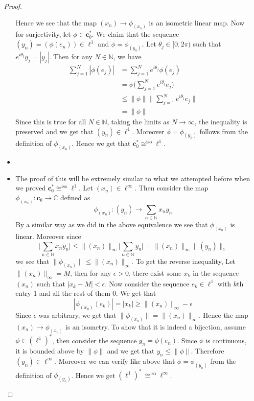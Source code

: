 \begin{proof}
\begin{itemize}[]
      Hence we see that the map $(x_n) \to \phi_{(x_n)}$ is an isometric linear map. Now for surjectivity, let $\phi \in \textbf{c}_0^{*}$. We claim that the sequence $(y_n) = (\phi(e_n)) \in \ell^1$ and $\phi = \phi_{(y_n)}$. Let $\theta_j \in [0, 2\pi)$ such that $e^{ i \theta_j}y_j = |y_j|$. Then for any $N \in \mathbb{N}$, we have \begin{align*}
        \sum_{j = 1}^{N} |\phi(e_j)| &=  \sum_{j = 1}^{N} e^{i \theta_j}\phi(e_j) \\ 
        &= \phi \Big(\sum_{j = 1}^{N} e^{i \theta_j} e_j \Big) \\ 
        &\le \|\phi\| \Big \| \sum_{j = 1}^{N} e^{i \theta_j} e_j \Big \| \\ 
        &= \|\phi\|
        \end{align*}
       Since this is true for all $N \in \mathbb{N}$, taking the limits as $N \to \infty$, the inequality is preserved and we get that $(y_n) \in \ell^1$. Moreover $\phi = \phi_{(y_n)}$ follows from the definition of $ \phi_{(x_n)}$. Hence we get that $  \textbf{c}_0^{*} \cong^{\textrm{iso}} \ell^1$.
    \item 
    \item The proof of this will be extremely similar to what we attempted before when we proved $\textbf{c}_0^{*} \cong^{\textrm{iso}} \ell^1$. Let $(x_n) \in \ell^\infty$. Then consider the map $\phi_{(x_n)}: \textbf{c}_0 \to \mathbb{C}$ defined as $$\phi_{(x_n)}: (y_n) \to \sum_{n \in \mathbb{N}} x_ny_n$$
      By a similar way as we did in the above equivalence we see that $\phi_{(x_n)}$ is linear. Moreover since \[
        \Big | \sum_{n \in \mathbb{N}} x_n y_n \Big | \le \|(x_n)\|_\infty \Big | \sum_{n \in \mathbb{N}} y_n \Big | = \|(x_n)\|_\infty \|(y_n)\|_1
      \]
      we see that $\|\phi_{(x_n)}\| \le \|(x_n)\|_{\infty}$. To get the reverse inequality, Let $\|(x_n)\|_\infty = M$, then for any $\epsilon >0$, there exist some $x_k$ in the sequence $(x_n)$ such that $|x_k - M| < \epsilon$. Now consider the sequence $e_k \in \ell^1$ with $k$th entry $1$ and all the rest of them $0$. We get that \[
        |\phi_{(x_n)}(e_k)| = |x_k| \ge \|(x_n)\|_\infty - \epsilon
      \]
      Since $\epsilon$ was arbitrary, we get that $\|\phi_{(x_n)}\| = \|(x_n)\|_{\infty}$. Hence the map $(x_n) \to \phi_{(x_n)}$ is an isometry. To show that it is indeed a bijection, assume $\phi \in (\ell^1)^{*}$, then consider the sequence $y_n = \phi(e_n)$. Since $\phi$ is continuous, it is bounded above by $ \|\phi\|$ and we get that $ y_n \le \|\phi\|$. Therefore $(y_n) \in \ell^\infty$. Moreover we can verify like above that $\phi = \phi_{(y_n)}$ from the definition of $\phi_{(y_n)}$. Hence we get $(\ell^1)^{*} \ \cong^{\textrm{iso}} \ell^\infty$.
  \end{itemize}
\end{proof}

